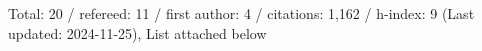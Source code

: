 Total: 20 / refereed: 11 / first author: 4 / citations: 1,162 / h-index: 9 (Last updated: 2024-11-25), List attached below